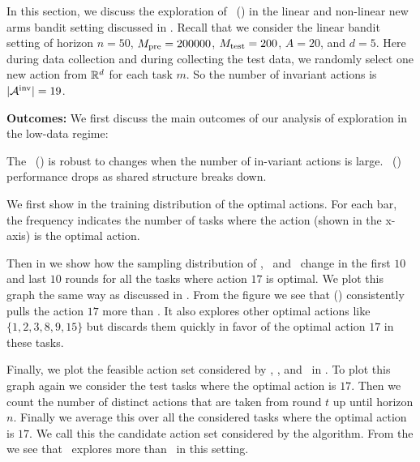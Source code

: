 In this section, we discuss the exploration of \pred\ (\gt) in the linear and non-linear new arms bandit setting discussed in .  Recall that we consider the linear bandit setting of horizon $n=50$, $M_{\text{pre}} = 200000$, $M_{\text{test}} = 200$, $A=20$, and $d=5$. 
%
Here during data collection and during collecting the test data, we randomly select one new action from $\mathbb{R}^d$ for each task $m$. 
%
So the number of invariant actions is $|\mathcal{A}^{\text{inv}}| = 19$.
% 
%


\textbf{Outcomes:} We first discuss the main outcomes of our analysis of exploration in the low-data regime:

\begin{tcolorbox}
    \customfinding The \pred\ (\gt) is robust to changes when the number of in-variant actions is large. \pred\ (\gt) performance drops as shared structure breaks down.
\end{tcolorbox}





We first show in  the training distribution of the optimal actions. For each bar, the frequency indicates the number of tasks where the action (shown in the x-axis) is the optimal action.

Then in  we show how the sampling distribution of \dptg, \pred\, and \predt\ change in the first $10$ and last $10$ rounds for all the tasks where action $17$ is optimal. We plot this graph the same way as discussed in .
%
%
From the figure  we see that \pred (\gt) consistently pulls the action $17$ more than \dptg. It also explores other optimal actions like $\{1,2,3,8,9,15\}$ but discards them quickly in favor of the optimal action $17$ in these tasks. 

Finally, we plot the feasible action set considered by \dptg, \pred, and \predt\ in . To plot this graph again we consider the test tasks where the optimal action is $17$. Then we count the number of distinct actions that are taken from round $t$ up until horizon $n$. Finally we average this over all the considered tasks where the optimal action is $17$. We call this the candidate action set considered by the algorithm. From the  we see that \predt\ explores more than \pred\ in this setting.

